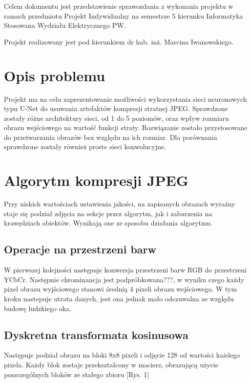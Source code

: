 \documentclass[a4paper,11pt]{article}
\begin{document}
\maketitle
	Celem dokumentu jest przedstawienie sprawozdania z wykonania projektu w ramach przedmiotu Projekt Indywidualny na semestrze 5 kierunku Informatyka Stosowana Wydziału Elektrycznego PW.
\begin{center}
Projekt realizowany jest pod kierunkiem dr hab. inż. Marcina Iwanowskiego.
\end{center}

\newpage

\tableofcontents
\newpage
\section{Opis problemu}
\indent Projekt ma na celu zaprezentowanie możliwości wykorzystania sieci neuronowych typu U-Net do usuwania artefaktów kompresji stratnej JPEG.
Sprawdzone zostały różne architektury sieci, od 1 do 5 poziomów, oraz wpływ rozmiaru obrazu wejściowego na wartość funkcji straty.
Rozwiązanie zostało przystosowane do przetwarzania obrazów bez względu na ich rozmiar.
Dla porównania sprawdzone zostały również proste sieci konwolucyjne.
\section{Algorytm kompresji JPEG}
Przy niskich wartościach ustawienia jakości, na zapisanych obrazach wyraźny staje się podział zdjęcia na sekcje przez algorytm,
jak i zaburzenia na krawędziach obiektów. Wynikają one ze sposobu działania algorytmu.
\subsection{Operacje na przestrzeni barw}
W pierwszej kolejności następuje konwersja przestrzeni barw RGB do przestrzeni YCbCr.
Następnie chrominancja jest podpróbkowana???, w wyniku czego każdy pixel obrazu wyjściowego stanowi średnią 4 pixeli obrazu wejściowego.
W tym kroku nastepuje utrata danych, jest ona jednak mało odczuwalna ze względu budowę ludzkiego oka.
\subsection{Dyskretna transformata kosinusowa}
Następuje podział obrazu na bloki 8x8 pixeli i odjęcie 128 od wartości każdego pixela.
Każdy blok zostaje przekształcony w macierz, obrazującą użycie poszczególnych bloków ze stałego zbioru [Rys. 1] \\
\end{document}
